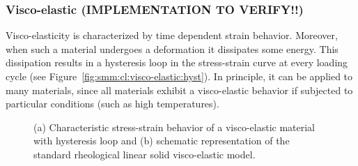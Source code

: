 \subsubsection{Visco-elastic (IMPLEMENTATION TO VERIFY!!)}

Visco-elasticity is characterized by time dependent strain behavior. Moreover,
when such a material undergoes a deformation it dissipates some energy. This
dissipation results in a hysteresis loop in the stress-strain curve at every
loading cycle (see Figure~\ref{fig:smm:cl:visco-elastic:hyst}). In principle, it
can be applied to many materials, since all materials exhibit a visco-elastic
behavior if subjected to particular conditions (such as high temperatures).
\begin{figure}[!htb]
  \begin{center}

    \hspace{0.05\textwidth}
    \caption{(a) Characteristic stress-strain behavior of a visco-elastic material with hysteresis loop and (b) schematic representation of the standard rheological linear solid visco-elastic model.}
    \label{fig:smm:cl:visco-elastic}
  \end{center}
\end{figure}
